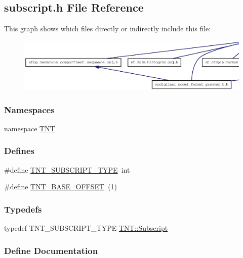 \subsection{subscript.h File Reference}
\label{subscript_8h}
This graph shows which files directly or indirectly include this file:
\nopagebreak
\begin{figure}[H]
\begin{center}
\leavevmode
\includegraphics[width=400pt]{subscript_8h__dep__incl}
\end{center}
\end{figure}
\subsubsection*{Namespaces}
\begin{DoxyCompactItemize}
\item 
namespace \hyperlink{namespace_t_n_t}{TNT}
\end{DoxyCompactItemize}
\subsubsection*{Defines}
\begin{DoxyCompactItemize}
\item 
\#define \hyperlink{subscript_8h_ae204fca2c823f77ee865da86d3bf53d0}{TNT\_\-SUBSCRIPT\_\-TYPE}~int
\item 
\#define \hyperlink{subscript_8h_a78d6fd551f343b6837c74aab34fa268c}{TNT\_\-BASE\_\-OFFSET}~(1)
\end{DoxyCompactItemize}
\subsubsection*{Typedefs}
\begin{DoxyCompactItemize}
\item 
typedef TNT\_\-SUBSCRIPT\_\-TYPE \hyperlink{namespace_t_n_t_af22e3f1460e145c04ce4e7d701e4c1c1}{TNT::Subscript}
\end{DoxyCompactItemize}


\subsubsection{Define Documentation}
